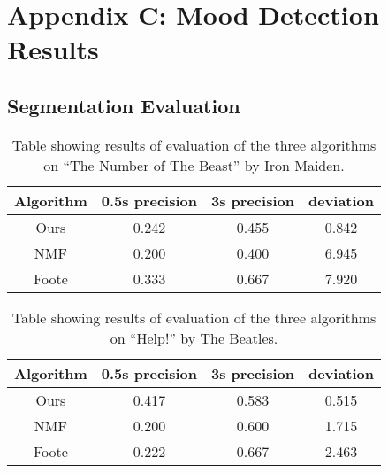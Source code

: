 
\chapter{Appendix C: Mood Detection Results} %

\label{AppendixC} %


\section{Segmentation Evaluation}
\label{sec:segevalapp}

\begin{table}
\begin{center}
\begin{tabular}{| c | c | c | c |} \hline 
Algorithm  &   0.5s precision   	&  3s precision 		&   deviation   	\\ \hline \hline
Ours			& 	0.242				&  0.455				& 	0.842		\\ \hline
NMF			&  0.200				&  0.400				&	6.945		\\ \hline
Foote		&  0.333				&  0.667				& 	7.920		\\ \hline
\end{tabular}
\caption{Table showing results of evaluation of the three algorithms on ``The Number of The Beast'' by Iron Maiden.}
\label{table:evalnumberbeast}
\end{center}
\end{table}

\begin{table}
\begin{center}
\begin{tabular}{| c | c | c | c |} \hline 
Algorithm  &   0.5s precision   	&  3s precision 	&   deviation   	\\ \hline \hline
Ours			& 	0.417				&  0.583			& 	0.515		\\ \hline
NMF			&  0.200				&  0.600			&	1.715		\\ \hline
Foote		&  0.222				&  0.667			& 	2.463		\\ \hline
\end{tabular}
\caption{Table showing results of evaluation of the three algorithms on ``Help!'' by The Beatles.}
\label{table:evalhelp}
\end{center}
\end{table}

